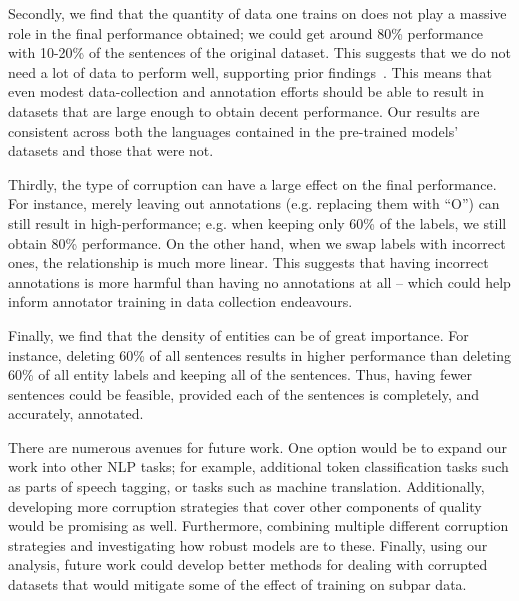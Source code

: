 \documentclass{article}
\newcommand{\mike}[1]{\textcolor{red}{#1}}
\begin{document}
Secondly, we find that the quantity of data one trains on does not play a massive role in the final performance obtained; we could get around 80\% performance with 10-20\% of the sentences of the original dataset. This suggests that we do not need a lot of data to perform well, supporting prior findings~\citep{adelani2022Thousand}. This means that even modest data-collection and annotation efforts should be able to result in datasets that are large enough to obtain decent performance. Our results are consistent across both the languages contained in the pre-trained models' datasets and those that were not. 

Thirdly, the type of corruption can have a large effect on the final performance. For instance, merely leaving out annotations (e.g. replacing them with ``O'') can still result in high-performance; e.g. when keeping only 60\% of the labels, we still obtain 80\% performance. On the other hand, when we swap labels with incorrect ones, the relationship is much more linear. This suggests that having incorrect annotations is more harmful than having no annotations at all -- which could help inform annotator training in data collection endeavours.

Finally, we find that the density of entities can be of great importance. For instance, deleting 60\% of all sentences results in higher performance than deleting 60\% of all entity labels and keeping all of the sentences. Thus, having fewer sentences could be feasible, provided each of the sentences is completely, and accurately, annotated.

There are numerous avenues for future work. One option would be to expand our work into other NLP tasks; for example, additional token classification tasks such as parts of speech tagging, or tasks such as machine translation. Additionally, developing more corruption strategies that cover other components of quality would be promising as well. Furthermore, combining multiple different corruption strategies and investigating how robust models are to these. Finally, using our analysis, future work could develop better methods for dealing with corrupted datasets that would mitigate some of the effect of training on subpar data.
\end{document}
